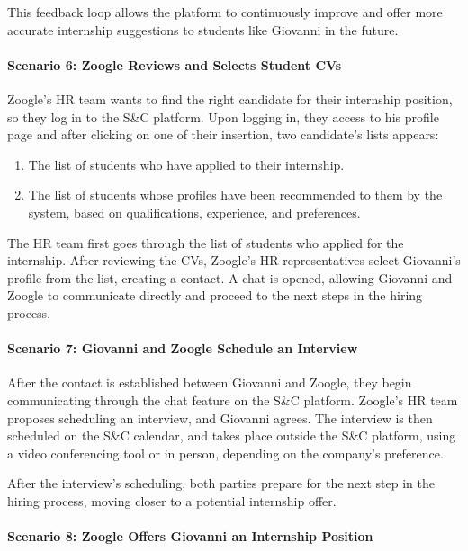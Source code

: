 This feedback loop allows the platform to continuously improve and offer
more accurate internship suggestions to students like Giovanni in the
future.


\paragraph{Scenario 6: Zoogle Reviews and Selects Student CVs}

Zoogle's HR team wants to find the right candidate for their internship
position, so they log in to the S\&C platform. Upon logging in, they
access to his profile page and after clicking on one of their insertion,
two candidate's lists appears:

\begin{enumerate}
\def\labelenumi{\arabic{enumi}.}
\item
  The list of students who have applied to their internship.
\item
  The list of students whose profiles have been recommended to them by
  the system, based on qualifications, experience, and preferences.~
\end{enumerate}

The HR team first goes through the list of students who applied for the
internship. After reviewing the CVs, Zoogle's HR representatives select
Giovanni's profile from the list, creating a contact. A chat is opened,
allowing Giovanni and Zoogle to communicate directly and proceed to the
next steps in the hiring process.


\paragraph{Scenario 7: Giovanni and Zoogle Schedule an Interview}

After the contact is established between Giovanni and Zoogle, they
begin communicating through the chat feature on the S\&C platform.
Zoogle's HR team proposes scheduling an interview, and
Giovanni agrees. The interview is then scheduled on the S\&C
calendar, and takes place outside the S\&C platform, using a
video conferencing tool or in person, depending on the company's
preference.

After the interview's scheduling, both parties prepare for the next step
in the hiring process, moving closer to a potential internship offer.


\paragraph{Scenario 8: Zoogle Offers Giovanni an Internship Position}

